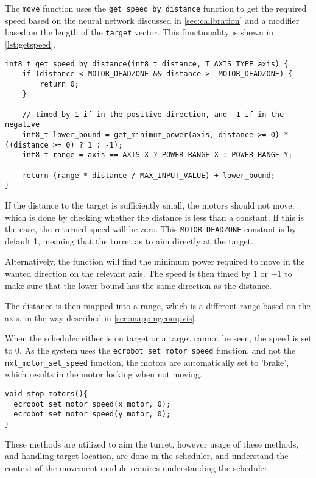 The \texttt{move} function uses the \texttt{get\_speed\_by\_distance} function to get the required speed based on the neural network discussed in \autoref{sec:calibration} and a modifier based on the length of the \texttt{target} vector.
This functionality is shown in \autoref{lst:getspeed}.

\begin{lstlisting}[language=CSharp,caption={get\_speed\_by\_distance method from movement.c},label={lst:getspeed},firstnumber={109}]
int8_t get_speed_by_distance(int8_t distance, T_AXIS_TYPE axis) {
	if (distance < MOTOR_DEADZONE && distance > -MOTOR_DEADZONE) {
		return 0;
	}
	
	// timed by 1 if in the positive direction, and -1 if in the negative
	int8_t lower_bound = get_minimum_power(axis, distance >= 0) * ((distance >= 0) ? 1 : -1);
	int8_t range = axis == AXIS_X ? POWER_RANGE_X : POWER_RANGE_Y;
	
	return (range * distance / MAX_INPUT_VALUE) + lower_bound;
}
\end{lstlisting}

If the distance to the target is sufficiently small, the motors should not move, which is done by checking whether the distance is less than a constant.
If this is the case, the returned speed will be zero.
This \texttt{MOTOR\_DEADZONE} constant is by default 1, meaning that the turret as to aim directly at the target.

Alternatively, the function will find the minimum power required to move in the wanted direction on the relevant axis.
The speed is then timed by $1$ or $-1$ to make sure that the lower bound has the same direction as the distance.

The distance is then mapped into a range, which is a different range based on the axis, in the way described in \autoref{sec:mappingcompvis}.

When the scheduler either is on target or a target cannot be seen, the speed is set to $0$.
As the system uses the \texttt{ecrobot\_set\_motor\_speed} function, and not the \texttt{nxt\_motor\_set\_speed} function, the motors are automatically set to 'brake', which results in the motor locking when not moving.
\begin{lstlisting}[language=CSharp,label={lst:StopMotors},caption={stop\_motors method from movement.c}]
void stop_motors(){
  ecrobot_set_motor_speed(x_motor, 0);
  ecrobot_set_motor_speed(y_motor, 0);
}
\end{lstlisting}

These methods are utilized to aim the turret, however usage of these methods, and handling target location, are done in the scheduler, and understand the context of the movement module requires understanding the scheduler.